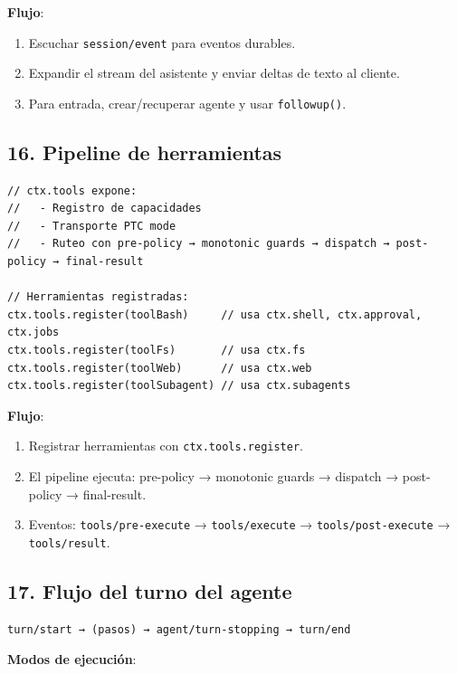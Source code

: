 \documentclass[11pt,a4paper]{article}
\begin{document}
\textbf{Flujo}:


\begin{enumerate}[leftmargin=*,topsep=2pt,itemsep=1pt]
  \item Escuchar \texttt{session/event} para eventos durables.
  \item Expandir el stream del asistente y enviar deltas de texto al cliente.
  \item Para entrada, crear/recuperar agente y usar \texttt{followup()}.
\end{enumerate}


\subsection*{16. Pipeline de herramientas}


\begin{lstlisting}
// ctx.tools expone:
//   - Registro de capacidades
//   - Transporte PTC mode
//   - Ruteo con pre-policy → monotonic guards → dispatch → post-policy → final-result

// Herramientas registradas:
ctx.tools.register(toolBash)     // usa ctx.shell, ctx.approval, ctx.jobs
ctx.tools.register(toolFs)       // usa ctx.fs
ctx.tools.register(toolWeb)      // usa ctx.web
ctx.tools.register(toolSubagent) // usa ctx.subagents
\end{lstlisting}


\textbf{Flujo}:


\begin{enumerate}[leftmargin=*,topsep=2pt,itemsep=1pt]
  \item Registrar herramientas con \texttt{ctx.tools.register}.
  \item El pipeline ejecuta: pre-policy → monotonic guards → dispatch → post-policy → final-result.
  \item Eventos: \texttt{tools/pre-execute} → \texttt{tools/execute} → \texttt{tools/post-execute} → \texttt{tools/result}.
\end{enumerate}


\subsection*{17. Flujo del turno del agente}


\begin{lstlisting}
turn/start → (pasos) → agent/turn-stopping → turn/end
\end{lstlisting}


\textbf{Modos de ejecución}:
\end{document}

